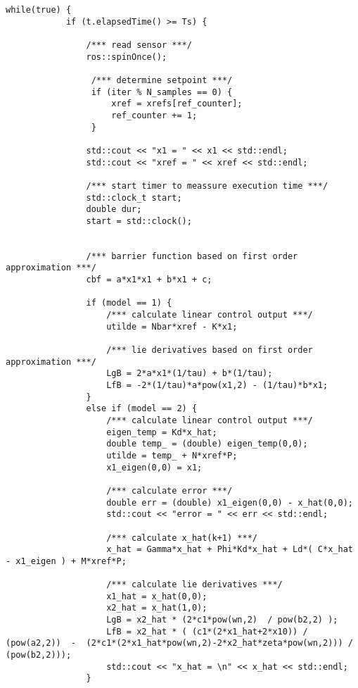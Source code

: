 \begin{lstlisting}[language=gedit]
        while(true) {
            if (t.elapsedTime() >= Ts) {
              
                /*** read sensor ***/ 
                ros::spinOnce();
 
                 /*** determine setpoint ***/
                 if (iter % N_samples == 0) {
                     xref = xrefs[ref_counter];
                     ref_counter += 1; 
                 }
          
                std::cout << "x1 = " << x1 << std::endl;
                std::cout << "xref = " << xref << std::endl;
 
                /*** start timer to meassure execution time ***/
                std::clock_t start;
                double dur;
                start = std::clock();               
               

                /*** barrier function based on first order approximation ***/
                cbf = a*x1*x1 + b*x1 + c;

                if (model == 1) {
                    /*** calculate linear control output ***/
                    utilde = Nbar*xref - K*x1;

                    /*** lie derivatives based on first order approximation ***/
                    LgB = 2*a*x1*(1/tau) + b*(1/tau);
                    LfB = -2*(1/tau)*a*pow(x1,2) - (1/tau)*b*x1;
                }
                else if (model == 2) {
                    /*** calculate linear control output ***/
                    eigen_temp = Kd*x_hat;
                    double temp_ = (double) eigen_temp(0,0);
                    utilde = temp_ + N*xref*P;
                    x1_eigen(0,0) = x1;

                    /*** calculate error ***/
                    double err = (double) x1_eigen(0,0) - x_hat(0,0);
                    std::cout << "error = " << err << std::endl;

                    /*** calculate x_hat(k+1) ***/
                    x_hat = Gamma*x_hat + Phi*Kd*x_hat + Ld*( C*x_hat - x1_eigen ) + M*xref*P;

                    /*** calculate lie derivatives ***/
                    x1_hat = x_hat(0,0);
                    x2_hat = x_hat(1,0);
                    LgB = x2_hat * (2*c1*pow(wn,2)  / pow(b2,2) );
                    LfB = x2_hat * ( (c1*(2*x1_hat+2*x10)) / (pow(a2,2))  -  (2*c1*(2*x1_hat*pow(wn,2)-2*x2_hat*zeta*pow(wn,2))) / (pow(b2,2)));          
                    std::cout << "x_hat = \n" << x_hat << std::endl;
                }


\end{lstlisting}
